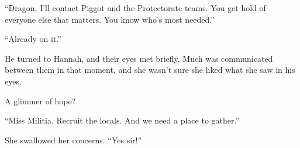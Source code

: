 ``Dragon, I'll contact Piggot and the Protectorate teams.  You get hold of everyone else that matters.  You know who's most needed.''



``Already on it.''



He turned to Hannah, and their eyes met briefly.  Much was communicated between them in that moment, and she wasn't sure she liked what she saw in his eyes.



A glimmer of hope?



``Miss Militia.  Recruit the locals.  And we need a place to gather.''



She swallowed her concerns.  ``Yes sir!''





